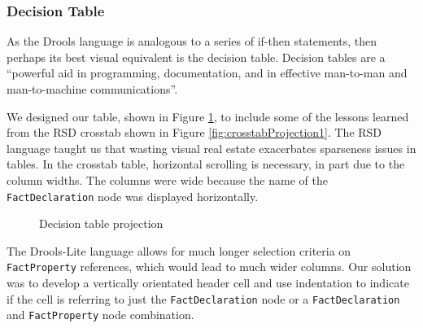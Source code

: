 \subsubsection{Decision Table}

As the Drools language is analogous to a series of if-then statements, then perhaps its best visual equivalent is the decision table.
Decision tables are a ``powerful aid in programming, documentation, and in effective man-to-man and man-to-machine communications''\cite{pooch1974translation}.

We designed our table, shown in Figure \ref{fig:decisionTableProjection}, to include some of the lessons learned from the RSD crosstab shown in Figure \ref{fig:crosstabProjection1}.
The RSD language taught us that wasting visual real estate exacerbates sparseness issues in tables.
In the crosstab table, horizontal scrolling is necessary, in part due to the column widths.
The columns were wide because the name of the \texttt{FactDeclaration} node was displayed horizontally.

\begin{figure}[h]
    \centering
    \caption{Decision table projection}
    \label{fig:decisionTableProjection}
\end{figure}

The Drools-Lite language allows for much longer selection criteria on \texttt{FactProperty} references, which would lead to much wider columns.
Our solution was to develop a vertically orientated header cell and use indentation to indicate if the cell is referring to just the \texttt{FactDeclaration} node or a \texttt{FactDeclaration} and \texttt{FactProperty} node combination.

